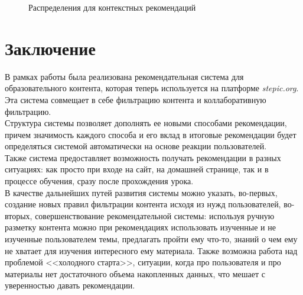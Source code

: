 \documentclass[12pt]{article}
\begin{document}
\begin{figure}[h]
  \centering
  \hfill
    \caption{Распределения для контекстных рекомендаций}
    \label{fig:context_distibutions}
\end{figure}


\section*{Заключение}
\indent В рамках работы была реализована рекомендательная система для образовательного контента, которая теперь используется на платформе \textit{stepic.org}. Эта система совмещает в себе фильтрацию контента и коллаборативную фильтрацию.
\\\indent Структура системы позволяет дополнять ее новыми способами рекомендации, причем значимость каждого способа и его вклад в итоговые рекомендации будет определяться системой автоматически на основе реакции пользователей.
\\\indent Также система предоставляет возможность получать рекомендации в разных ситуациях: как просто при входе на сайт, на домашней странице, так и в процессе обучения, сразу после прохождения урока. 
\\\indent В качестве дальнейших путей развития системы можно указать, во-первых, создание новых правил фильтрации контента исходя из нужд пользователей, во-вторых, совершенствование рекомендательной системы: используя ручную разметку контента можно при рекомендациях использовать изученные и не изученные пользователем темы, предлагать пройти ему что-то, знаний о чем ему не хватает для изучения интересного ему материала. Также возможна работа над проблемой <<холодного старта>>, ситуации, когда про пользователя и про материалы нет достаточного объема накопленных данных, что мешает с уверенностью давать рекомендации.



\setmonofont[Mapping=tex-text]{CMU Typewriter Text}


\end{document}
